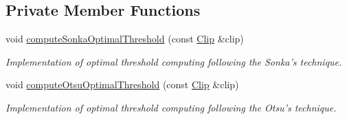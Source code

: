 \subsection*{Private Member Functions}
\begin{CompactItemize}
\item 
void \hyperlink{class_preprocessor_3d4fa7e4721c62997beb93a41d729c99}{computeSonkaOptimalThreshold} (const \hyperlink{class_clip}{Clip} \&clip)
\begin{CompactList}\small\item\em Implementation of optimal threshold computing following the Sonka's technique. \item\end{CompactList}\item 
void \hyperlink{class_preprocessor_faa4368f471a3e5d0cb46865a2a1ccb7}{computeOtsuOptimalThreshold} (const \hyperlink{class_clip}{Clip} \&clip)
\begin{CompactList}\small\item\em Implementation of optimal threshold computing following the Otsu's technique. \item\end{CompactList}\end{CompactItemize}

